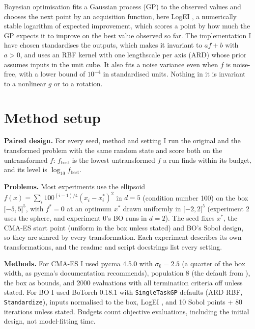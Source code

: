 \documentclass[12pt,a4paper]{article}
\begin{document}
Bayesian optimisation fits a Gaussian process (GP) \cite{frazier2018} to the observed values and chooses the next point by an acquisition function, here LogEI \cite{ament2023}, a numerically stable logarithm of expected improvement, which scores a point by how much the GP expects it to improve on the best value observed so far. The implementation I have chosen standardises the outputs, which makes it invariant to \(af + b\) with \(a > 0\), and uses an RBF kernel with one lengthscale per axis (ARD) whose prior assumes inputs in the unit cube. It also fits a noise variance even when \(f\) is noise-free, with a lower bound of \(10^{- 4}\) in standardised units. Nothing in it is invariant to a nonlinear \(g\) or to a rotation.

\section{Method setup}

\textbf{Paired design.} For every seed, method and setting I run the original and the transformed problem with the same random state and score both on the untransformed \(f\): \(f_{\text{best}}\) is the lowest untransformed \(f\) a run finds within its budget, and its level is \(\log_{10}f_{\text{best}}\).

\textbf{Problems.} Most experiments use the ellipsoid \(f(x) = \sum_{i}100^{(i - 1)/4}\left( x_{i} - x_{i}^{\ast} \right)^{2}\) in \(d = 5\) (condition number 100) on the box \(\lbrack - 5,5\rbrack^{5}\), with \(f^{\ast} = 0\) at an optimum \(x^{\ast}\) drawn uniformly in \(\lbrack - 2,2\rbrack^{5}\) (experiment 2 uses the sphere, and experiment 0's BO runs in \(d = 2\)). The seed fixes \(x^{\ast}\), the CMA-ES start point (uniform in the box unless stated) and BO's Sobol design, so they are shared by every transformation. Each experiment describes its own transformations, and the readme and script docstrings list every setting.

\textbf{Methods.} For CMA-ES I used pycma 4.5.0 with \(\sigma_{0} = 2.5\) (a quarter of the box width, as pycma's documentation recommends), population 8 (the default from \cite{hansen2016}), the box as bounds, and 2000 evaluations with all termination criteria off unless stated. For BO I used BoTorch 0.18.1 with \texttt{SingleTaskGP} defaults (ARD RBF, \texttt{Standardize}), inputs normalised to the box, LogEI \cite{ament2023}, and 10 Sobol points + 80 iterations unless stated. Budgets count objective evaluations, including the initial design, not model-fitting time.
\end{document}
